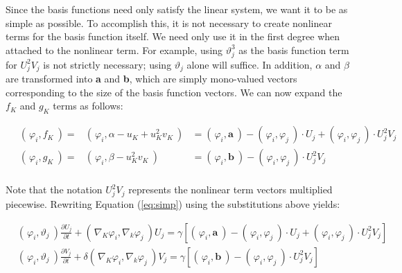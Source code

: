 \documentclass[12pt]{article}
\begin{document}
Since the basis functions need only satisfy the linear system, we want it to be as simple as possible. To accomplish this, it is not necessary to create nonlinear terms for the basis function itself. We need only use it in the first degree when attached to the nonlinear term. For example, using $\vartheta_j^3$ as the basis function term for $U_j^2V_j$ is not strictly necessary; using $\vartheta_j$ alone will suffice. In addition, $\alpha$ and $\beta$  are transformed into \textbf{a} and \textbf{b}, which are simply mono-valued vectors corresponding to the size of the basis function vectors. We can now expand the $f_K$ and $g_K$ terms as follows:

\begin{equation}
\begin{aligned}
~&\left(\frac{}{}\varphi_i, f_K~\right)  =& \left(\frac{}{}\varphi_i, \alpha- u_K+ u_K^2v_K~\right)  &= \left(\frac{}{}\varphi_i, \textbf{a} ~\right) - \left(\frac{}{}\varphi_i, \varphi_j ~\right)\cdot U_j + \left(\frac{}{}\varphi_i, \varphi_j ~\right)\cdot U_j^2V_j\\
~&\left(\frac{}{}\varphi_i, g_K~\right)  =& \left(\frac{}{}\varphi_i, \beta- u_K^2v_K~\right) ~~~~ &= \left(\frac{}{}\varphi_i, \textbf{b} ~\right) - \left(\frac{}{}\varphi_i, \varphi_j ~\right)\cdot U_j^2V_j\\
\end{aligned}
\end{equation}

\noindent Note that the notation $U_j^2V_j$ represents the nonlinear term vectors multiplied piecewise. Rewriting Equation (\ref{eq:simp}) using the substitutions above yields:

\begin{equation}\label{eq:simp-full}
\begin{aligned}
&\left(\frac{}{}\varphi_i,\vartheta_j~\right)\frac{\partial U_j}{\partial t} + \left(\frac{}{}\nabla_K\varphi_i, \nabla_k\varphi_j~\right) U_j = \gamma \left[\left(\frac{}{}\varphi_i, \textbf{a} ~\right) - \left(\frac{}{}\varphi_i, \varphi_j ~\right)\cdot U_j + \left(\frac{}{}\varphi_i, \varphi_j ~\right)\cdot U_j^2V_j\right] \\
&\left(\frac{}{}\varphi_i,\vartheta_j~\right)\frac{\partial V_j}{\partial t} + \delta\left(\frac{}{}\nabla_K\varphi_i, \nabla_k\varphi_j~\right) V_j = \gamma \left[\left(\frac{}{}\varphi_i, \textbf{b} ~\right) - \left(\frac{}{}\varphi_i, \varphi_j ~\right)\cdot U_j^2V_j\right]
\end{aligned}	
\end{equation}
\end{document}

